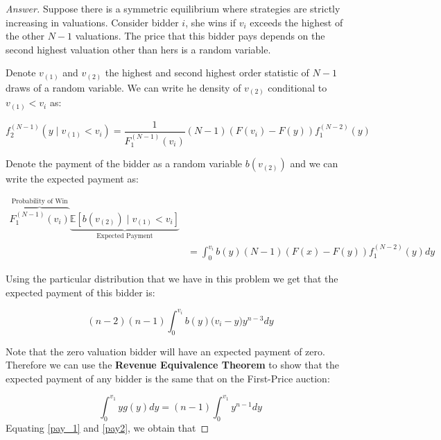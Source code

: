 \documentclass[12pt]{article}
\theoremstyle{definition}
\begin{document}
\begin{proof}[Answer]
Suppose there is a symmetric equilibrium where strategies are strictly increasing in valuations. Consider bidder $i$, she wins if $v_i$ exceeds the highest of the other $N-1$ valuations. The price that this bidder pays depends on the second highest valuation other than hers is a random variable. 

Denote $v_{(1)}$ and $v_{(2)}$ the highest and second  highest order statistic of $N-1$ draws of a random variable. We can write he density of $v_{(2)}$ conditional to $v_{(1)}<v_i$ as:

$$
f_{2}^{(N-1)}\left(y \mid v_{(1)}<v_i\right)=\frac{1}{F_{1}^{(N-1)}(v_i)}(N-1)(F(v_i)-F(y)) f_{1}^{(N-2)}(y)
$$

Denote the payment of the bidder as a random variable $b\left(v_{(2)}\right)$ and we can write the expected payment as:


$$
\begin{aligned}
\overbrace{F_{1}^{(N-1)}(v_i)}^{\text{Probability of Win}} \underbrace{\mathbb{E}\left[b\left(v_{(2)}\right) \mid v_{(1)}<v_i\right]}_{\text{Expected Payment}} \\
&=\int_{0}^{v_i} b(y)(N-1)(F(x)-F(y)) f_{1}^{(N-2)}(y) d y
\end{aligned}
$$

Using the particular distribution that we have in this problem we get that the expected payment of this bidder is:

\begin{equation}\label{pay_1}
(n-2)(n-1)\int_{0}^{v_i}{b(y)(v_i}-y)y^{n-3}dy    
\end{equation}


Note that the zero valuation bidder will have an expected payment of zero. Therefore we can use the \textbf{Revenue Equivalence Theorem} to show that the expected payment of any bidder is the same that on the First-Price auction:

\begin{equation}\label{pay2}
    \int_{0}^{v_1}yg(y)dy = (n-1)\int_{0}^{v_1}y^{n-1}dy
\end{equation}
Equating \eqref{pay_1} and \eqref{pay2}, we obtain that


\end{proof}
\end{document}

